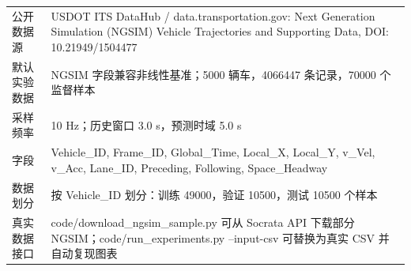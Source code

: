\begin{tabularx}{\textwidth}{lX}
\toprule
公开数据源 & USDOT ITS DataHub / data.transportation.gov: Next Generation Simulation (NGSIM) Vehicle Trajectories and Supporting Data, DOI: 10.21949/1504477 \\ 
默认实验数据 & NGSIM 字段兼容非线性基准；5000 辆车，4066447 条记录，70000 个监督样本 \\ 
采样频率 & 10 Hz；历史窗口 3.0 s，预测时域 5.0 s \\ 
字段 & Vehicle\_ID, Frame\_ID, Global\_Time, Local\_X, Local\_Y, v\_Vel, v\_Acc, Lane\_ID, Preceding, Following, Space\_Headway \\ 
数据划分 & 按 Vehicle\_ID 划分：训练 49000，验证 10500，测试 10500 个样本 \\ 
真实数据接口 & code/download\_ngsim\_sample.py 可从 Socrata API 下载部分 NGSIM；code/run\_experiments.py --input-csv 可替换为真实 CSV 并自动复现图表 \\ 
\bottomrule
\end{tabularx}
